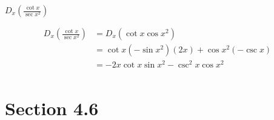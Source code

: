 \documentclass[fleqn]{exam}
\begin{document}
\begin{questions}



\question $D_x \left( \frac{\cot x}{\sec x^2} \right)$

\begin{solution}
\begin{align*}
  D_x \left( \frac{\cot x}{\sec x^2} \right) &= D_x \left( \cot x \cos x^2 \right) \\
  &= \cot x \left(- \sin x^2 \right)(2x) + \cos x^2 (- \csc x) \\
  &= -2x \cot x \sin x^2 - \csc^2 x \cos x^2 \\
\end{align*}

\end{solution}
\end{questions}

\ifprintanswers
\pagebreak

\section{Section 4.6}
\end{document}
